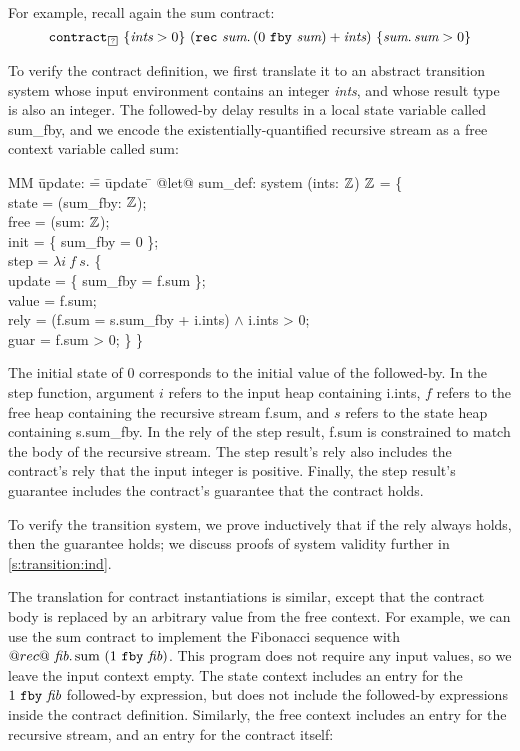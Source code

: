 For example, recall again the sum contract:
$$
\sumcontractX{\PSUnknown}{\textit{ints}}
$$

To verify the contract definition, we first translate it to an abstract transition system whose input environment contains an integer \emph{ints}, and whose result type is also an integer.
The followed-by delay results in a local state variable called sum_fby, and we encode the existentially-quantified recursive stream as a free context variable called sum:

  \begin{tabbing}
  MM \= update: \= = \= update \= \kill
  @let@ sum_def: system (ints: $\mathbb{Z}$) $\mathbb{Z}$ = \{ \\
  \> state   \> = (sum_fby: $\mathbb{Z}$); \\
  \> free  \> = (sum: $\mathbb{Z}$); \\
  \> init  \> = \{ sum_fby = 0 \}; \\
  \> step  \> = $\lambda{} i~f~s.$ \{ \\
  \> \> \> update \> = \{ sum_fby = f.sum \}; \\
  \> \> \> value  \> = f.sum; \\
  \> \> \> rely   \> = (f.sum = s.sum_fby + i.ints) $\wedge$ i.ints > 0; \\
  \> \> \> guar   \> = f.sum > 0; \} \}
  \end{tabbing}

The initial state of 0 corresponds to the initial value of the followed-by.
In the step function, argument $i$ refers to the input heap containing i.ints, $f$ refers to the free heap containing the recursive stream f.sum, and $s$ refers to the state heap containing s.sum_fby.
In the rely of the step result, f.sum is constrained to match the body of the recursive stream.
The step result's rely also includes the contract's rely that the input integer is positive.
Finally, the step result's guarantee includes the contract's guarantee that the contract holds.

To verify the transition system, we prove inductively that if the rely always holds, then the guarantee holds; we discuss proofs of system validity further in \autoref{s:transition:ind}.

The translation for contract instantiations is similar, except that the contract body is replaced by an arbitrary value from the free context.
For example, we can use the sum contract to implement the Fibonacci sequence with
$
  @rec@~\textit{fib}.\, \text{sum}~(1~\texttt{fby}~\textit{fib})
$.
This program does not require any input values, so we leave the input context empty.
The state context includes an entry for the $1~\texttt{fby}~\textit{fib}$ followed-by expression, but does not include the followed-by expressions inside the contract definition.
Similarly, the free context includes an entry for the recursive stream, and an entry for the contract itself:

